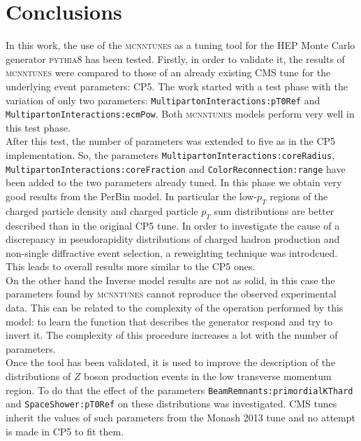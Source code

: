 \chapter*{Conclusions}

In this work, the use of the \textsc{mcnntunes} as a tuning tool for the HEP Monte Carlo generator \textsc{pythia8} has been tested. 
Firstly, in order to validate it, the results of \textsc{mcnntunes} were compared to those of an already existing CMS tune for the underlying event parameters: CP5. The work started with a test phase with the variation of only two parameters: \texttt{Multi}\-\texttt{parton}\-\texttt{Interactions:}\-\texttt{pT0Ref} and \texttt{Multi}\-\texttt{parton}\-\texttt{Interactions:}\-\texttt{ecmPow}. Both \textsc{mcnntunes} models perform very well in this test phase. 
\\
After this test, the number of parameters was extended to five as in the CP5 implementation. So, the parameters \texttt{Multi}\-\texttt{parton}\-\texttt{Interactions:}\-\texttt{core}\-\texttt{Radius}, \texttt{Multi}\-\texttt{parton}\-\texttt{Interactions:}\-\texttt{core}\-\texttt{Fraction} and \texttt{Color}\-\texttt{Reconnection:}\-\texttt{range} have been added to the two parameters already tuned. In this phase we obtain very good results from the PerBin model. In particular the low-$p_T$ regions of the charged particle density and charged particle $p_T$ sum distributions are better described than in the original CP5 tune.  
In order to investigate the cause of a discrepancy in pseudorapidity distributions of charged hadron production and non-single diffractive event selection, a reweighting technique was introdcued.
This leads to overall results more similar to the CP5 ones.
\\
On the other hand the Inverse model results are not as solid, in this case the parameters found by \textsc{mcnntunes} cannot reproduce the observed experimental data.
This can be related to the complexity of the operation performed by this model: to learn the function that describes the generator respond and try to invert it. The complexity of this procedure  increases a lot with the number of parameters.
\\
Once the tool has been validated, it is used to improve the description of the distributions of $Z$ boson production events in the low transverse momentum region. To do that the effect of the parameters \texttt{BeamRemnants:}\-\texttt{primordialKT}\-\texttt{hard} and \texttt{SpaceShower:}\-\texttt{pT0Ref} on these distributions was investigated. CMS tunes inherit the values of such parameters from the Monash 2013  tune and no attempt is made in CP5 to fit them. 
